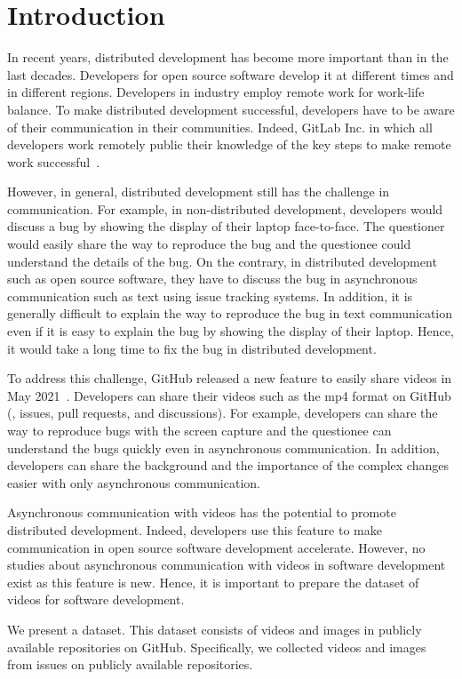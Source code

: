 \section{Introduction}
\label{sec:intro}
In recent years, distributed development has become 
more important than in the last decades. 
Developers for open source software develop it 
at different times and in different regions. 
Developers in industry employ remote work for work-life balance. 
To make distributed development successful, 
developers have to be aware of their communication 
in their communities. 
Indeed, GitLab Inc. in which all developers work remotely 
public their knowledge of the key steps 
to make remote work successful~\citep{gitlab2020remoteplaybook}. 


However, in general, distributed development still has 
the challenge in communication. 
For example, in non-distributed development, 
developers would discuss a bug by showing the display of 
their laptop face-to-face. 
The questioner would easily share the way to reproduce the bug 
and the questionee could understand the details of the bug. 
On the contrary, in distributed development such as 
open source software, they have to discuss the bug 
in asynchronous communication 
such as text using issue tracking systems. 
In addition, it is generally difficult to explain the way 
to reproduce the bug in text communication 
even if it is easy to explain the bug by showing 
the display of their laptop. 
Hence, it would take a long time to fix the bug 
in distributed development. 


To address this challenge, GitHub released a new feature 
to easily share videos in May 2021~\citep{github-video-blog}. 
Developers can share their videos such as the mp4 format 
on GitHub (\eg,  issues, pull requests, and discussions). 
For example, developers can share the way to reproduce bugs 
with the screen capture and the questionee can understand 
the bugs quickly even in asynchronous communication. 
In addition, developers can share the background and 
the importance of the complex changes easier with 
only asynchronous communication. 


Asynchronous communication with videos has the potential 
to promote distributed development. 
Indeed, developers use this feature to make communication 
in open source software development accelerate. 
However, no studies about asynchronous communication with 
videos in software development exist 
as this feature is new. 
Hence, it is important to prepare the dataset of videos 
for software development. 


We present a dataset. 
This dataset consists of videos and images 
in publicly available repositories on GitHub. 
Specifically, we collected 
 videos and 
 images from 
 issues on
 publicly available repositories.
